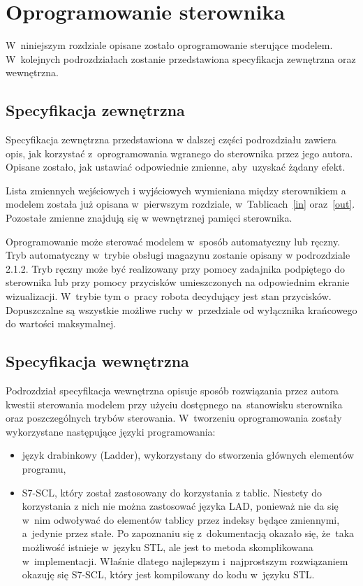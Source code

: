 \section{Oprogramowanie sterownika}
W~niniejszym rozdziale opisane zostało oprogramowanie sterujące modelem. W~kolejnych podrozdziałach zostanie przedstawiona specyfikacja zewnętrzna oraz wewnętrzna. 

\subsection{Specyfikacja zewnętrzna}
Specyfikacja zewnętrzna przedstawiona w dalszej części podrozdziału zawiera opis, jak korzystać z~oprogramowania wgranego do sterownika przez jego autora. Opisane zostało, jak ustawiać odpowiednie zmienne, aby~uzyskać żądany efekt.

Lista zmiennych wejściowych i wyjściowych wymieniana między sterownikiem a modelem została już opisana w~pierwszym rozdziale, w~Tablicach~\ref{in} oraz~\ref{out}. Pozostałe zmienne znajdują się w wewnętrznej pamięci sterownika.

Oprogramowanie może sterować modelem w~sposób automatyczny lub ręczny. Tryb automatyczny w~trybie obsługi magazynu zostanie opisany w podrozdziale 2.1.2. Tryb ręczny może być realizowany przy pomocy zadajnika podpiętego do sterownika lub przy pomocy przycisków umieszczonych na odpowiednim ekranie wizualizacji. W~trybie tym o~pracy robota decydujący jest stan przycisków. Dopuszczalne są wszystkie możliwe ruchy w~przedziale od wyłącznika krańcowego do wartości maksymalnej.

\subsection{Specyfikacja wewnętrzna}
Podrozdział specyfikacja wewnętrzna opisuje sposób rozwiązania przez autora kwestii sterowania modelem przy użyciu dostępnego na~stanowisku sterownika oraz poszczególnych trybów sterowania.
W~tworzeniu oprogramowania zostały wykorzystane następujące języki programowania:
\begin{itemize} 
\item język drabinkowy (Ladder), wykorzystany do stworzenia głównych elementów programu,
\item S7-SCL, który został zastosowany do korzystania z tablic. Niestety do korzystania z nich nie można zastosować języka LAD, ponieważ nie da się w~nim odwoływać do elementów tablicy przez indeksy będące zmiennymi, a~jedynie przez stałe. Po zapoznaniu się z~dokumentacją okazało się, że~taka możliwość istnieje w~języku STL, ale jest to metoda skomplikowana w~implementacji. Właśnie dlatego najlepszym i~najprostszym rozwiązaniem okazuję się S7-SCL, który jest kompilowany do kodu w~języku STL.
\end{itemize} 